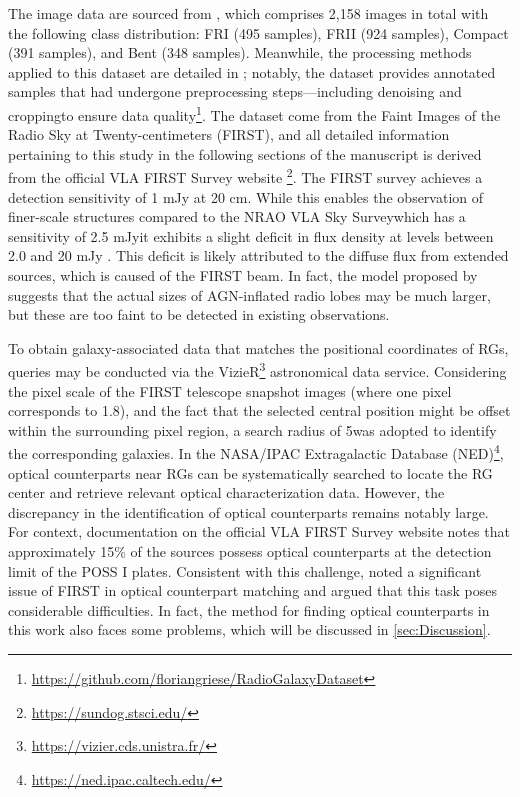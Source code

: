 \documentclass{aa}
\begin{document}
The image data are sourced from \cite{griese_floriangrieseradiogalaxydataset_2022}, which comprises 2,158 images in total with the following class distribution: FRI (495 samples), FRII (924 samples), Compact (391 samples), and Bent (348 samples). Meanwhile, the processing methods applied to this dataset are detailed in \cite{griese_first_2023}; notably, the dataset provides annotated samples that had undergone preprocessing steps—including denoising and cropping\textemdash to ensure data quality\footnote{\url{https://github.com/floriangriese/RadioGalaxyDataset}}. The dataset come from the Faint Images of the Radio Sky at Twenty-centimeters (FIRST), and all detailed information pertaining to this study in the following sections of the manuscript is derived from the official VLA FIRST Survey website \footnote{\url{https://sundog.stsci.edu/}}. The FIRST survey achieves a detection sensitivity of 1 mJy at 20 cm. While this enables the observation of finer-scale structures compared to the NRAO VLA Sky Survey\textemdash which has a sensitivity of 2.5 mJy\textemdash it exhibits a slight deficit in flux density at levels between 2.0 and 20 mJy \citep{helfand_last_2015}. This deficit is likely attributed to the diffuse flux from extended sources, which is caused of the FIRST beam. In fact, the model proposed by \citep{shabala_delayed_2017} suggests that the actual sizes of AGN-inflated radio lobes may be much larger, but these are too faint to be detected in existing observations.


To obtain galaxy-associated data that matches the positional coordinates of RGs, queries may be conducted via the VizieR\footnote{\url{https://vizier.cds.unistra.fr/}} astronomical data service. Considering the pixel scale of the FIRST telescope snapshot images (where one pixel corresponds to 1.8\arcsec), and the fact that the selected central position might be offset within the surrounding pixel region, a search radius of 5\arcsec was adopted to identify the corresponding galaxies. In the NASA/IPAC Extragalactic Database (NED)\footnote{\url{https://ned.ipac.caltech.edu/}}, optical counterparts near RGs can be systematically searched to locate the RG center and retrieve relevant optical characterization data. However, the discrepancy in the identification of optical counterparts remains notably large. For context, documentation on the official VLA FIRST Survey website notes that approximately 15\% of the sources possess optical counterparts at the detection limit of the POSS I plates. Consistent with this challenge, \citep{helfand_last_2015} noted a significant issue of FIRST in optical counterpart matching and argued that this task poses considerable difficulties. In fact, the method for finding optical counterparts in this work also faces some problems, which will be discussed in \autoref{sec:Discussion}.
\end{document}
